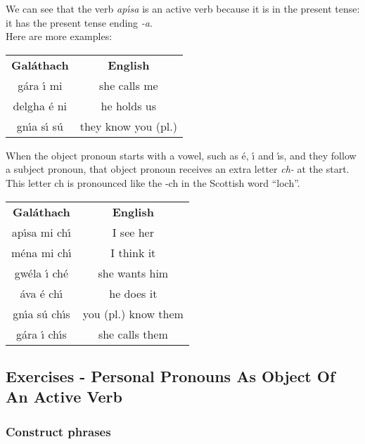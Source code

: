 We can see that the verb \textit{ap\'{\i}sa} is an active verb because it is in the present tense: it has the present tense ending \textit{-a}.\\

Here are more examples:
\begin{table}[H]
\centering
\begin{tabular}{cc}
  \toprule
  \textbf{Gal\'{a}thach} & \textbf{English}\\
  \cmidrule(lr){1-1}\cmidrule(lr){2-2}
  g\'{a}ra \'{\i} mi & she calls me\\
  delgha \'{e} ni & he holds us\\
  gn\'{\i}a s\'{\i} s\'{u} & they know you (pl.)\\
  \bottomrule
\end{tabular}
\label{examples_verbs_vso_more_examples}
\end{table}

When the object pronoun starts with a vowel, such as \'{e}, \'{\i} and \'{\i}s, and they follow a subject pronoun, that object pronoun receives an extra letter \textit{ch-} at the start. This letter ch is pronounced like the -ch in the Scottish word ``loch''.
\begin{table}[H]
\centering
\begin{tabular}{cc}
  \toprule
  \textbf{Gal\'{a}thach} & \textbf{English}\\
  \cmidrule(lr){1-1}\cmidrule(lr){2-2}
  ap\'{\i}sa mi ch\'{\i} & I see her\\
  m\'{e}na mi ch\'{\i} & I think it\\
  gw\'{e}la \'{\i} ch\'{e} & she wants him\\
  \'{a}va \'{e} ch\'{\i} & he does it\\
  gn\'{\i}a s\'{u} ch\'{\i}s & you (pl.) know them\\
  g\'{a}ra \'{\i} ch\'{\i}s & she calls them\\
  \bottomrule
\end{tabular}
\label{examples_verbs_vso_extra_ch}
\end{table}

\newpage
\subsection{Exercises - Personal Pronouns As Object Of An Active Verb}

\subsubsection{Construct phrases}

